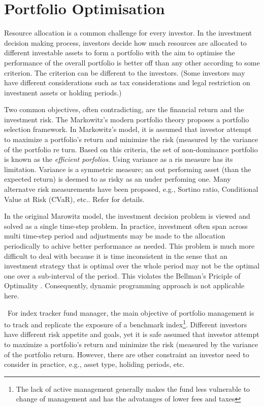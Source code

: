\section{Portfolio Optimisation}
\label{sec:po}
Resource allocation is a common challenge for every investor. In the investment decision making process, investors decide how much resources are allocated to different investable assets to form a portfolio with the aim to optimise the performance of the overall portfolio is better off than any other according to some criterion. The criterion can be different to the investors. (Some investors may have different considerations such as tax considerations and legal restriction on investment assets or holding periods.)

Two common objectives, often contradicting, are the financial return and the investment risk. The Markowitz's modern portfolio theory \cite{HM58} proposes a portfolio selection framework. In Markowitz's model, it is assumed that investor attempt to maximize a portfolio's return and minimize the risk (measured by the variance of the portfolio re turn. Based on this criteria, the set of non-dominance portfolio is known as the \emph{efficient porfolios}. Using variance as a ris measure has its limitation. Variance is a symmetric measure; an out performing asset (than the expected return) is deemed to as risky as an under perfoming one. Many alternatve risk measurements have been proposed, e.g., Sortino ratio, Conditional Value at Risk (CVaR), etc.. Refer \cite{RTR00} for details.

In the original Marowitz model, the investment decision problem is viewed and solved as a single time-step problem. In practice, investment often span across multi time-step period and adjustments may be made to the allocation periodically to achive better performance as needed. This problem is much more difficult to deal with because it is time inconsistent in the sense that an investment strategy that is optimal over the whole period may not be the optimal one over a sub-interval of the period. This violates the Bellman's Priciple of Optimality \cite{BR57}. Consequently, dynamic programming approach is not applicable here.

\
For index tracker fund manager, the main objective of portfolio management is to track and replicate the exposure of a benchmark index\footnote{The lack of active management generally makes the fund less vulnerable to change of management and has the advatanges of lower fees and taxes}.
Different investors have different risk appetite and goals, yet it is safe assumed that investor attempt to maximize a portfolio's return and minimize the risk (measured by the variance of the portfolio return. However, there are other constraint an investor need to consider in practice, e.g., asset type, holiding periods, etc. 

